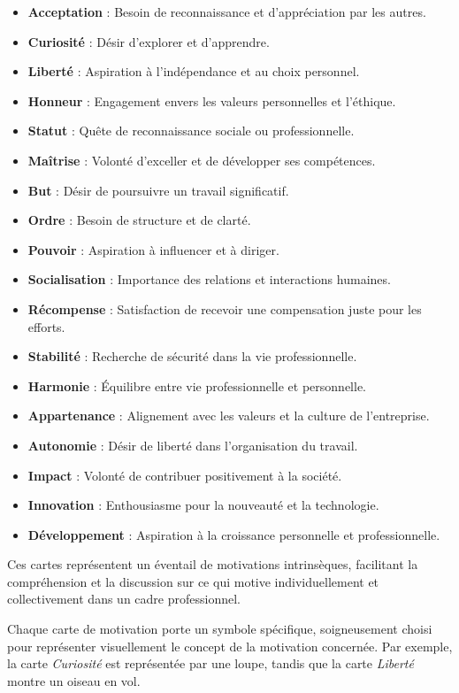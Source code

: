 \documentclass[oneside, a5paper, 12pt]{book}
\begin{document}
\begin{itemize}
	\item \textbf{Acceptation} : Besoin de reconnaissance et d'appréciation par les autres.
	\item \textbf{Curiosité} : Désir d'explorer et d'apprendre.
	\item \textbf{Liberté} : Aspiration à l'indépendance et au choix personnel.
	\item \textbf{Honneur} : Engagement envers les valeurs personnelles et l'éthique.
	\item \textbf{Statut} : Quête de reconnaissance sociale ou professionnelle.
	\item \textbf{Maîtrise} : Volonté d'exceller et de développer ses compétences.
	\item \textbf{But} : Désir de poursuivre un travail significatif.
	\item \textbf{Ordre} : Besoin de structure et de clarté.
	\item \textbf{Pouvoir} : Aspiration à influencer et à diriger.
	\item \textbf{Socialisation} : Importance des relations et interactions humaines.
	\item \textbf{Récompense} : Satisfaction de recevoir une compensation juste pour les efforts.
	\item \textbf{Stabilité} : Recherche de sécurité dans la vie professionnelle.
	\item \textbf{Harmonie} : Équilibre entre vie professionnelle et personnelle.
	\item \textbf{Appartenance} : Alignement avec les valeurs et la culture de l'entreprise.
	\item \textbf{Autonomie} : Désir de liberté dans l'organisation du travail.
	\item \textbf{Impact} : Volonté de contribuer positivement à la société.
	\item \textbf{Innovation} : Enthousiasme pour la nouveauté et la technologie.
	\item \textbf{Développement} : Aspiration à la croissance personnelle et professionnelle.
\end{itemize}
Ces cartes représentent un éventail de motivations intrinsèques, facilitant la compréhension et la discussion sur ce qui motive individuellement et collectivement dans un cadre professionnel.

Chaque carte de motivation porte un symbole spécifique, soigneusement choisi pour représenter visuellement le concept de la motivation concernée. Par exemple, la carte \textit{Curiosité} est représentée par une loupe, tandis que la carte \textit{Liberté} montre un oiseau en vol.
\end{document}
